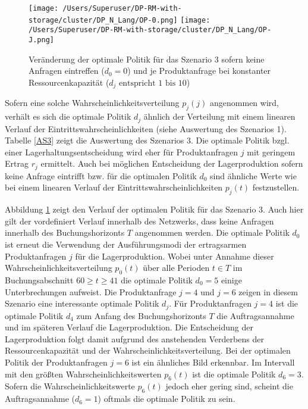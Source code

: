 \begin{figure}[h!]     
\begin{center}
\texttt{[image: /Users/Superuser/DP-RM-with-storage/cluster/DP\_N\_Lang/OP-0.png]}
\texttt{[image: /Users/Superuser/DP-RM-with-storage/cluster/DP\_N\_Lang/OP-J.png]}
    \caption{Veränderung der optimale Politik für das Szenario 3 sofern keine Anfragen eintreffen ($d_0=0$) und je Produktanfrage bei konstanter Ressourcenkapazität ($d_j\text{ entspricht }1\text{ bis }10$)}  \label{SV3}
  \end{center}
\end{figure}

Sofern eine solche Wahrscheinlichkeitsverteilung $p_j(j)$ angenommen wird, verhält es sich die optimale Politik $d_j$ ähnlich der Verteilung mit einem linearen Verlauf der Eintrittswahrscheinlichkeiten (siehe Auswertung des Szenarios 1). Tabelle \ref{AS3} zeigt die Auswertung des Szenarios 3. Die optimale Politik bzgl. einer Lagerhaltungsentscheidung wird eher für Produktanfragen $j$ mit geringem Ertrag $r_j$ ermittelt. Auch bei möglichen Entscheidung der Lagerproduktion sofern keine Anfrage eintrifft bzw. für die optimalen Politik $d_0$ sind ähnliche Werte wie bei einem linearen Verlauf der Eintrittswahrscheinlichkeiten $p_j(t)$ festzustellen.

Abbildung \ref{SV3} zeigt den Verlauf der optimalen Politik für das Szenario 3. Auch hier gilt der vordefiniert Verlauf innerhalb des Netzwerks, dass keine Anfragen innerhalb des Buchungshorizonts $T$ angenommen werden. Die optimale Politik $d_0$ ist erneut die Verwendung der Ausführungsmodi der ertragsarmen Produktanfragen $j$ für die Lagerproduktion. Wobei unter Annahme dieser Wahrscheinlichkeitsverteilung $p_0(t)$ über alle Perioden $t\in T$ im Buchungsabschnitt $60\ge t \ge 41$ die optimale Politik $d_0=5$ einige Unterbrechungen aufweist. Die Produktanfrage $j=4$ und $j=6$ zeigen in diesem Szenario eine interessante optimale Politik $d_j$. Für Produktanfragen $j=4$ ist die optimale Politik $d_4$ zum Anfang des Buchungshorizonts $T$ die Auftragsannahme und im späteren Verlauf die Lagerproduktion. Die Entscheidung der Lagerproduktion folgt damit aufgrund des anstehenden Verderbens der Ressourcenkapazität und der Wahrscheinlichkeitsverteilung. Bei der optimalen Politik der Produktanfragen $j=6$ ist ein ähnliches Bild erkennbar. Im Intervall mit den größten Wahrscheinlichkeitswerten $p_6(t)$ ist die optimale Politik $d_6=3$. Sofern die Wahrscheinlichkeitswerte $p_6(t)$ jedoch eher gering sind, scheint die Auftragsannahme ($d_6=1$) oftmals die optimale Politik zu sein. 

